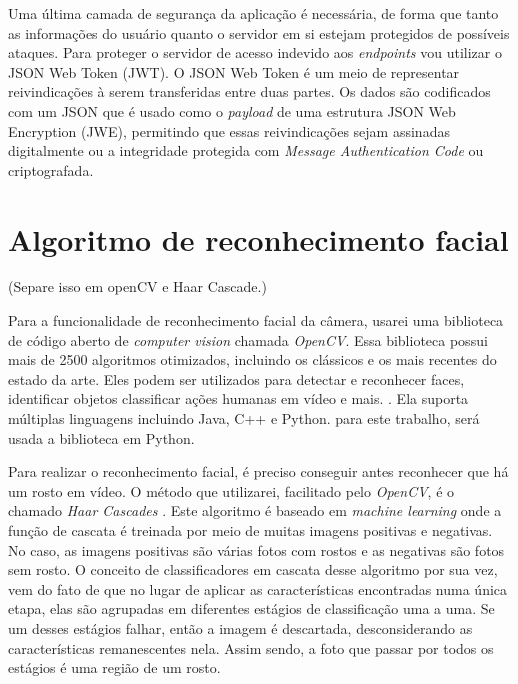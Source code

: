\documentclass[12pt, %
openright, 
oneside, %
a4paper,    %
brazil]{facom-ufu-abntex2}
\begin{document}
Uma última camada de segurança da aplicação é necessária, de forma que tanto as
informações do usuário quanto o servidor em si estejam protegidos de possíveis
ataques. Para proteger o servidor de acesso indevido aos \emph{endpoints} vou
utilizar o JSON Web Token (JWT). O JSON Web Token é um meio de representar
reivindicações à serem transferidas entre duas partes. Os dados são codificados
com um JSON que é usado como o \emph{payload} de uma estrutura JSON Web
Encryption (JWE), permitindo que essas reivindicações sejam assinadas
digitalmente ou a integridade protegida com \emph{Message Authentication Code}
ou criptografada. \cite{jsonwebtoken}

\section{Algoritmo de reconhecimento facial}

 (Separe isso em openCV e Haar Cascade.)

Para a funcionalidade de reconhecimento facial da câmera, usarei uma biblioteca
de código aberto de \emph{computer vision} chamada \emph{OpenCV}. Essa
biblioteca possui mais de 2500 algoritmos otimizados, incluindo os clássicos e
os mais recentes do estado da arte. Eles podem ser utilizados para detectar e
reconhecer faces, identificar objetos classificar ações humanas em vídeo e
mais. \cite{opencv}. Ela suporta múltiplas linguagens incluindo Java, C++ e
Python. para este trabalho, será usada a biblioteca em Python.

Para realizar o reconhecimento facial, é preciso conseguir antes reconhecer que
há um rosto em vídeo. O método que utilizarei, facilitado pelo \emph{OpenCV}, é
o chamado \emph{Haar Cascades} \cite{viola2001rapid}. Este algoritmo é baseado
em \emph{machine learning} onde a função de cascata é treinada por meio de
muitas imagens positivas e negativas. No caso, as imagens positivas são várias
fotos com rostos e as negativas são fotos sem rosto. O conceito de
classificadores em cascata desse algoritmo por sua vez, vem do fato de que no
lugar de aplicar as características encontradas numa única etapa, elas são
agrupadas em diferentes estágios de classificação uma a uma. Se um desses
estágios falhar, então a imagem é descartada, desconsiderando as
características remanescentes nela. Assim sendo, a foto que passar por todos os
estágios é uma região de um rosto.
\end{document}
